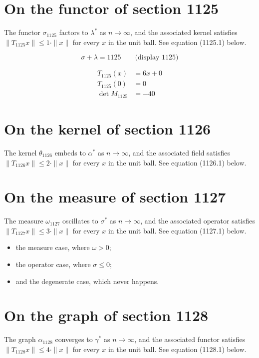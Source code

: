 \documentclass{article}
\begin{document}
\section{On the functor of section 1125}
The functor $\sigma_{1125}$ factors to $\lambda^{*}$ as $n \to \infty$,
and the associated kernel satisfies $\|T_{1125} x\| \leq 1 \cdot \|x\|$
for every $x$ in the unit ball. See equation (1125.1) below.

$$
\sigma + \lambda = 1125 \qquad \text{(display 1125)}
$$

\begin{align}
T_{1125}(x) &= 6 x + 0 \\
T_{1125}(0) &= 0 \\
\det M_{1125} &= -40
\end{align}

\section{On the kernel of section 1126}
The kernel $\theta_{1126}$ embeds to $\alpha^{*}$ as $n \to \infty$,
and the associated field satisfies $\|T_{1126} x\| \leq 2 \cdot \|x\|$
for every $x$ in the unit ball. See equation (1126.1) below.

\section{On the measure of section 1127}
The measure $\omega_{1127}$ oscillates to $\sigma^{*}$ as $n \to \infty$,
and the associated operator satisfies $\|T_{1127} x\| \leq 3 \cdot \|x\|$
for every $x$ in the unit ball. See equation (1127.1) below.

\begin{itemize}
  \item the measure case, where $\omega > 0$;
  \item the operator case, where $\sigma \leq 0$;
  \item and the degenerate case, which never happens.
\end{itemize}

\section{On the graph of section 1128}
The graph $\alpha_{1128}$ converges to $\gamma^{*}$ as $n \to \infty$,
and the associated functor satisfies $\|T_{1128} x\| \leq 4 \cdot \|x\|$
for every $x$ in the unit ball. See equation (1128.1) below.
\end{document}
